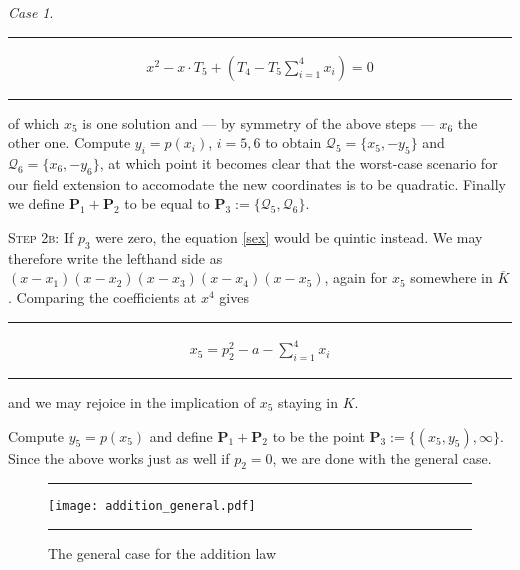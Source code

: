 \documentclass[english,11pt,a4paper]{article}
\theoremstyle{definition}
\theoremstyle{remark}
\theoremstyle{case}
\newtheorem{case}{Case}
\renewcommand{\P}{\mathbf{P}}
\newcommand{\q}{\mathcal{Q}}
\newcommand{\sumfo}{\sum_{i=1}^4 x_i}
\renewcommand{\bar}{\overline}
\begin{document}
\begin{case}
	\vspace{-3mm}
	\rule{\textwidth}{0.005in}
	\begin{align*}
		\tag{$\dagger$} \label{dagger} x^2 - x \cdot T_5 + \left(T_4 - T_5 \sumfo \right) = 0
	\end{align*}
	\rule{\textwidth}{0.005in}

	of which $x_5$ is one solution and --- by symmetry of the above steps --- $x_6$ the other one. Compute $y_i=p(x_i)$, $i=5,6$ to obtain $\q_5 = \{ x_5, -y_5 \}$ and $\q_6 = \{ x_6, -y_6 \}$, at which point it becomes clear that the worst-case scenario for our field extension to accomodate the new coordinates is to be quadratic. Finally we define $\P_1 + \P_2$ to be equal to $\P_3 := \{ \q_5, \q_6 \}$.

	{\scshape Step 2b:} If $p_3$ were zero, the equation \eqref{sex} would be quintic instead. We may therefore write the lefthand side as $(x-x_1)(x-x_2)(x-x_3)(x-x_4)(x-x_5)$, again for $x_5$ somewhere in $\bar K$. Comparing the coefficients at $x^4$ gives

	\vspace{-3mm}
	\rule{\textwidth}{0.005in}
	\begin{align*}
		\tag{$\dagger \dagger$} \label{dagger2} x_5 = p_2^2 - a - \sum_{i=1}^4 x_i
	\end{align*}
	\rule{\textwidth}{0.005in}

	and we may rejoice in the implication of $x_5$ staying in $K$.

	Compute $y_5 = p(x_5)$ and define $\P_1 + \P_2$ to be the point $\P_3 := \{ (x_5, y_5), \infty \}$. Since the above works just as well if $p_2=0$, we are done with the general case.


\end{case}


\begin{figure}[ht]
	\rule{\textwidth}{0.005in}
	\begin{center}
		\vspace{1mm}
		\texttt{[image: addition\_general.pdf]}
	\end{center}
	\caption{The general case for the addition law}\label{fig_generalcase}
	\rule{\textwidth}{0.005in}
\end{figure}
\end{document}
